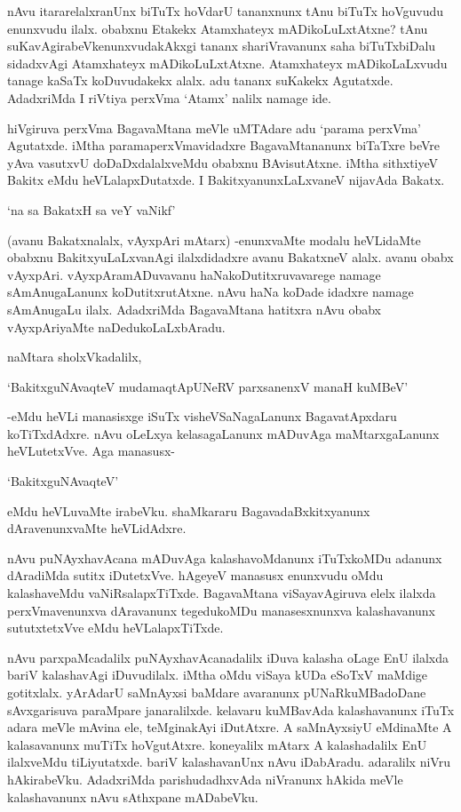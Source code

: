 nAvu itararelalxranUnx biTuTx hoVdarU tananxnunx tAnu biTuTx hoVguvudu enunxvudu ilalx. obabxnu Etakekx Atamxhateyx mADikoLuLxtAtxne? tAnu suKavAgirabeVkenunxvudakAkxgi tananx shariVravanunx saha biTuTxbiDalu sidadxvAgi Atamxhateyx mADikoLuLxtAtxne. Atamxhateyx mADikoLaLxvudu tanage kaSaTx koDuvudakekx alalx. adu tananx suKakekx Agutatxde. AdadxriMda I riVtiya perxVma `Atamx' nalilx namage ide.

hiVgiruva perxVma BagavaMtana meVle uMTAdare adu `parama perxVma' Agutatxde. iMtha paramaperxVmavidadxre BagavaMtananunx biTaTxre beVre yAva vasutxvU doDaDxdalalxveMdu obabxnu BAvisutAtxne. iMtha sithxtiyeV Bakitx eMdu heVLalapxDutatxde. I BakitxyanunxLaLxvaneV nijavAda Bakatx.

\begin{shloka}
`na sa BakatxH sa veY vaNikf'
\end{shloka}

(avanu Bakatxnalalx, vAyxpAri mAtarx) -enunxvaMte modalu heVLidaMte obabxnu BakitxyuLaLxvanAgi ilalxdidadxre avanu BakatxneV alalx. avanu obabx vAyxpAri. vAyxpAramADuvavanu haNakoDutitxruvavarege namage sAmAnugaLanunx koDutitxrutAtxne. nAvu haNa koDade idadxre namage sAmAnugaLu ilalx. AdadxriMda BagavaMtana hatitxra nAvu obabx vAyxpAriyaMte naDedukoLaLxbAradu.

naMtara sholxVkadalilx,

\begin{shloka}
`BakitxguNAvaqteV mudamaqtApUNeRV parxsanenxV manaH kuMBeV'
\end{shloka}

-eMdu heVLi manasisxge iSuTx visheVSaNagaLanunx BagavatApxdaru koTiTxdAdxre. nAvu oLeLxya kelasagaLanunx mADuvAga maMtarxgaLanunx heVLutetxVve. Aga manasusx-

\begin{shloka}
`BakitxguNAvaqteV'
\end{shloka}

eMdu heVLuvaMte irabeVku. shaMkararu BagavadaBxkitxyanunx dAravenunxvaMte heVLidAdxre.

nAvu puNAyxhavAcana mADuvAga kalashavoMdanunx iTuTxkoMDu adanunx dAradiMda sutitx iDutetxVve. hAgeyeV manasusx enunxvudu oMdu kalashaveMdu vaNiRsalapxTiTxde. BagavaMtana viSayavAgiruva elelx ilalxda perxVmavenunxva dAravanunx tegedukoMDu manasesxnunxva kalashavanunx sututxtetxVve eMdu heVLalapxTiTxde.

nAvu parxpaMcadalilx puNAyxhavAcanadalilx iDuva kalasha oLage EnU ilalxda bariV kalashavAgi iDuvudilalx. iMtha oMdu viSaya kUDa eSoTxV maMdige gotitxlalx. yArAdarU saMnAyxsi baMdare avaranunx pUNaRkuMBadoDane sAvxgarisuva paraMpare janaralilxde. kelavaru kuMBavAda kalashavanunx iTuTx adara meVle mAvina ele, teMginakAyi iDutAtxre. A saMnAyxsiyU eMdinaMte A kalasavanunx muTiTx hoVgutAtxre. koneyalilx mAtarx A kalashadalilx EnU ilalxveMdu tiLiyutatxde. bariV kalashavanUnx nAvu iDabAradu. adaralilx niVru hAkirabeVku. AdadxriMda parishudadhxvAda niVranunx hAkida meVle kalashavanunx nAvu sAthxpane mADabeVku.

